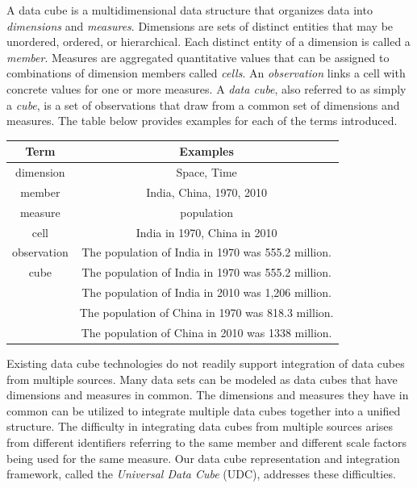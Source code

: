 A data cube is a multidimensional data structure that organizes data into \emph{dimensions} and \emph{measures}. Dimensions are sets of distinct entities that may be unordered, ordered, or hierarchical. Each distinct entity of a dimension is called a \emph{member}. Measures are aggregated quantitative values that can be assigned to combinations of dimension members called \emph{cells}. An \emph{observation} links a cell with concrete values for one or more measures. A \emph{data cube}, also referred to as simply a \emph{cube}, is a set of observations that draw from a common set of dimensions and measures. The table below provides examples for each of the terms introduced.

\begin{center}
  \begin{tabular}{ | c | c | }
    \hline
    \textbf{Term} & \textbf{Examples} \\ \hline
    dimension & Space, Time \\ \hline
    member & India, China, 1970, 2010 \\ \hline
    measure & population \\ \hline
    cell & India in 1970, China in 2010 \\ \hline
    observation & The population of India in 1970 was 555.2 million. \\ \hline
    cube & The population of India in 1970 was 555.2 million. \\
         & The population of India in 2010 was 1,206 million. \\
         & The population of China in 1970 was 818.3 million. \\
         & The population of China in 2010 was 1338 million. \\ \hline
  \end{tabular}
\end{center}

Existing data cube technologies do not readily support integration of data cubes from multiple sources. Many data sets can be modeled as data cubes that have dimensions and measures in common. The dimensions and measures they have in common can be utilized to integrate multiple data cubes together into a unified structure. The difficulty in integrating data cubes from multiple sources arises from different identifiers referring to the same member and different scale factors being used for the same measure. Our data cube representation and integration framework, called the \emph{Universal Data Cube} (UDC), addresses these difficulties.

